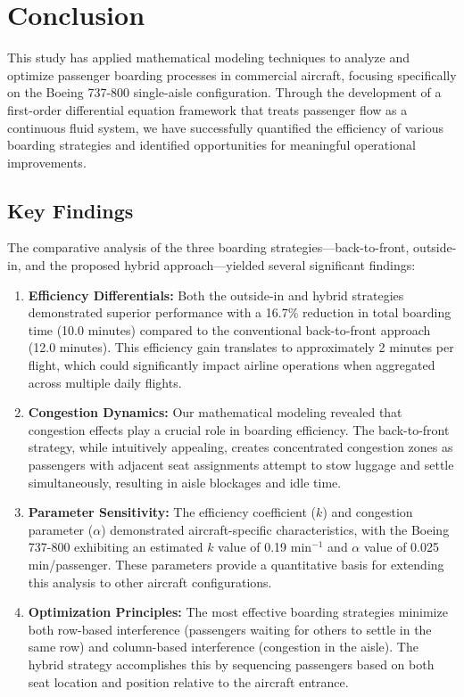 
\section{Conclusion}

This study has applied mathematical modeling techniques to analyze and optimize passenger boarding processes in commercial aircraft, focusing specifically on the Boeing 737-800 single-aisle configuration. Through the development of a first-order differential equation framework that treats passenger flow as a continuous fluid system, we have successfully quantified the efficiency of various boarding strategies and identified opportunities for meaningful operational improvements.

\subsection{Key Findings}

The comparative analysis of the three boarding strategies—back-to-front, outside-in, and the proposed hybrid approach—yielded several significant findings:

\begin{enumerate}
    \item \textbf{Efficiency Differentials:} Both the outside-in and hybrid strategies demonstrated superior performance with a 16.7\% reduction in total boarding time (10.0 minutes) compared to the conventional back-to-front approach (12.0 minutes). This efficiency gain translates to approximately 2 minutes per flight, which could significantly impact airline operations when aggregated across multiple daily flights.
    
    \item \textbf{Congestion Dynamics:} Our mathematical modeling revealed that congestion effects play a crucial role in boarding efficiency. The back-to-front strategy, while intuitively appealing, creates concentrated congestion zones as passengers with adjacent seat assignments attempt to stow luggage and settle simultaneously, resulting in aisle blockages and idle time.
    
    \item \textbf{Parameter Sensitivity:} The efficiency coefficient ($k$) and congestion parameter ($\alpha$) demonstrated aircraft-specific characteristics, with the Boeing 737-800 exhibiting an estimated $k$ value of 0.19 min$^{-1}$ and $\alpha$ value of 0.025 min/passenger. These parameters provide a quantitative basis for extending this analysis to other aircraft configurations.
    
    \item \textbf{Optimization Principles:} The most effective boarding strategies minimize both row-based interference (passengers waiting for others to settle in the same row) and column-based interference (congestion in the aisle). The hybrid strategy accomplishes this by sequencing passengers based on both seat location and position relative to the aircraft entrance.
\end{enumerate}

